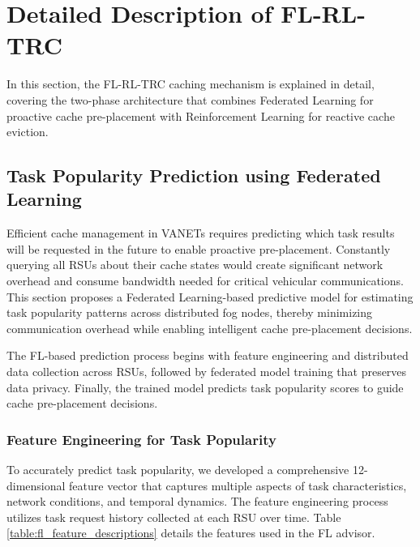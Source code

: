\section{Detailed Description of FL-RL-TRC}

In this section, the FL-RL-TRC caching mechanism is explained in detail, covering the two-phase architecture that combines Federated Learning for proactive cache pre-placement with Reinforcement Learning for reactive cache eviction.

\subsection{Task Popularity Prediction using Federated Learning}

Efficient cache management in VANETs requires predicting which task results will be requested in the future to enable proactive pre-placement. Constantly querying all RSUs about their cache states would create significant network overhead and consume bandwidth needed for critical vehicular communications. This section proposes a Federated Learning-based predictive model for estimating task popularity patterns across distributed fog nodes, thereby minimizing communication overhead while enabling intelligent cache pre-placement decisions.

The FL-based prediction process begins with feature engineering and distributed data collection across RSUs, followed by federated model training that preserves data privacy. Finally, the trained model predicts task popularity scores to guide cache pre-placement decisions.

\subsubsection{Feature Engineering for Task Popularity}

To accurately predict task popularity, we developed a comprehensive 12-dimensional feature vector that captures multiple aspects of task characteristics, network conditions, and temporal dynamics. The feature engineering process utilizes task request history collected at each RSU over time. Table \ref{table:fl_feature_descriptions} details the features used in the FL advisor.

